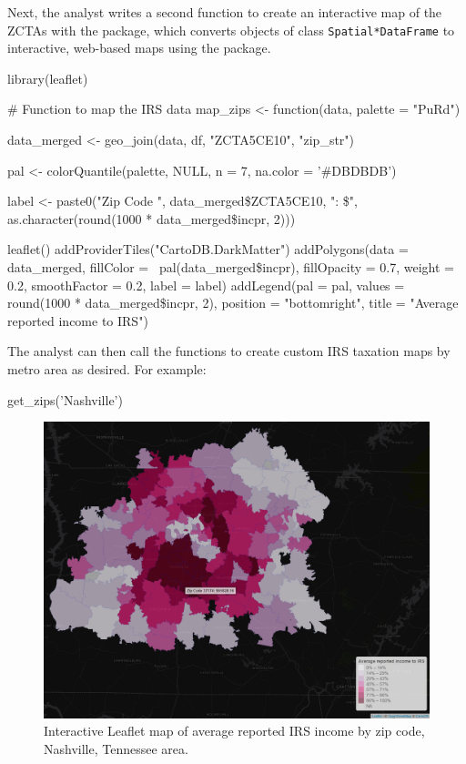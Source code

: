 Next, the analyst writes a second function to create an interactive map
of the ZCTAs with the  package, which converts objects
of class \texttt{Spatial*DataFrame} to interactive, web-based maps using
the  package.

\begin{Schunk}
\begin{Sinput}
library(leaflet)

# Function to map the IRS data
map_zips <- function(data, palette = "PuRd") {
  
  data_merged <- geo_join(data, df, "ZCTA5CE10", "zip_str")

  pal <- colorQuantile(palette, NULL, n = 7, na.color = '#DBDBDB')
  
  label <- paste0("Zip Code ", data_merged\$ZCTA5CE10, ": \$", 
                  as.character(round(1000 * data_merged\$incpr, 2)))
  
  leaflet() %
    addProviderTiles("CartoDB.DarkMatter") %
    addPolygons(data = data_merged, 
                fillColor = ~pal(data_merged\$incpr), 
                fillOpacity = 0.7, 
                weight = 0.2, 
                smoothFactor = 0.2, 
                label = label) %
    addLegend(pal = pal, 
              values = round(1000 * data_merged\$incpr, 2), 
              position = "bottomright", 
              title = "Average reported income to IRS")

}
\end{Sinput}
\end{Schunk}

The analyst can then call the functions to create custom IRS taxation
maps by metro area as desired. For example:

\begin{Schunk}
\begin{Sinput}
get_zips('Nashville') %
\end{Sinput}
\end{Schunk}

\begin{figure}[htbp]
  \centering
  \includegraphics[width=\textwidth]{nashville}
  \caption{Interactive Leaflet map of average reported IRS income by zip code, Nashville, Tennessee area.}
  \label{figure:nashville}
\end{figure}


